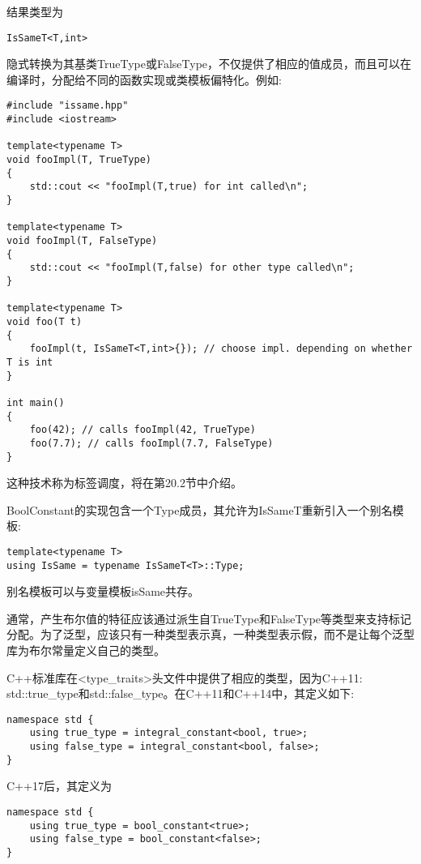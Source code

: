 结果类型为

\begin{lstlisting}[style=styleCXX]
IsSameT<T,int>
\end{lstlisting}

隐式转换为其基类TrueType或FalseType，不仅提供了相应的值成员，而且可以在编译时，分配给不同的函数实现或类模板偏特化。例如:

\begin{lstlisting}[style=styleCXX]
#include "issame.hpp"
#include <iostream>

template<typename T>
void fooImpl(T, TrueType)
{
	std::cout << "fooImpl(T,true) for int called\n";
}

template<typename T>
void fooImpl(T, FalseType)
{
	std::cout << "fooImpl(T,false) for other type called\n";
}

template<typename T>
void foo(T t)
{
	fooImpl(t, IsSameT<T,int>{}); // choose impl. depending on whether T is int
}

int main()
{
	foo(42); // calls fooImpl(42, TrueType)
	foo(7.7); // calls fooImpl(7.7, FalseType)
}
\end{lstlisting}

这种技术称为标签调度，将在第20.2节中介绍。

BoolConstant的实现包含一个Type成员，其允许为IsSameT重新引入一个别名模板:

\begin{lstlisting}[style=styleCXX]
template<typename T>
using IsSame = typename IsSameT<T>::Type;
\end{lstlisting}

别名模板可以与变量模板isSame共存。

通常，产生布尔值的特征应该通过派生自TrueType和FalseType等类型来支持标记分配。为了泛型，应该只有一种类型表示真，一种类型表示假，而不是让每个泛型库为布尔常量定义自己的类型。

C++标准库在<type\_traits>头文件中提供了相应的类型，因为C++11: std::true\_type和std::false\_type。在C++11和C++14中，其定义如下:

\begin{lstlisting}[style=styleCXX]
namespace std {
	using true_type = integral_constant<bool, true>;
	using false_type = integral_constant<bool, false>;
}
\end{lstlisting}

C++17后，其定义为

\begin{lstlisting}[style=styleCXX]
namespace std {
	using true_type = bool_constant<true>;
	using false_type = bool_constant<false>;
}
\end{lstlisting}

